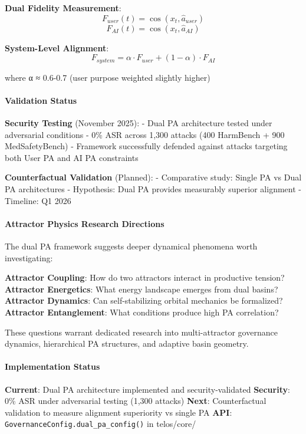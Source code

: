\textbf{Dual Fidelity Measurement}:
\[F_{user}(t) = \cos(x_t, \hat{a}_{user})\]
\[F_{AI}(t) = \cos(x_t, \hat{a}_{AI})\]

\textbf{System-Level Alignment}:
\[F_{system} = \alpha \cdot F_{user} + (1-\alpha) \cdot F_{AI}\]

where α ≈ 0.6-0.7 (user purpose weighted slightly higher)

\paragraph{Validation Status}\label{validation-status}

\textbf{Security Testing} (November 2025): - Dual PA architecture tested
under adversarial conditions - 0\% ASR across 1,300 attacks (400
HarmBench + 900 MedSafetyBench) - Framework successfully defended
against attacks targeting both User PA and AI PA constraints

\textbf{Counterfactual Validation} (Planned): - Comparative study:
Single PA vs Dual PA architectures - Hypothesis: Dual PA provides
measurably superior alignment - Timeline: Q1 2026

\paragraph{Attractor Physics Research
Directions}\label{attractor-physics-research-directions}

The dual PA framework suggests deeper dynamical phenomena worth
investigating:

\textbf{Attractor Coupling}: How do two attractors interact in
productive tension? \textbf{Attractor Energetics}: What energy landscape
emerges from dual basins? \textbf{Attractor Dynamics}: Can
self-stabilizing orbital mechanics be formalized? \textbf{Attractor
Entanglement}: What conditions produce high PA correlation?

These questions warrant dedicated research into multi-attractor
governance dynamics, hierarchical PA structures, and adaptive basin
geometry.

\paragraph{Implementation Status}\label{implementation-status}

\textbf{Current}: Dual PA architecture implemented and
security-validated \textbf{Security}: 0\% ASR under adversarial testing
(1,300 attacks) \textbf{Next}: Counterfactual validation to measure
alignment superiority vs single PA \textbf{API}:
\texttt{GovernanceConfig.dual\_pa\_config()} in telos/core/

